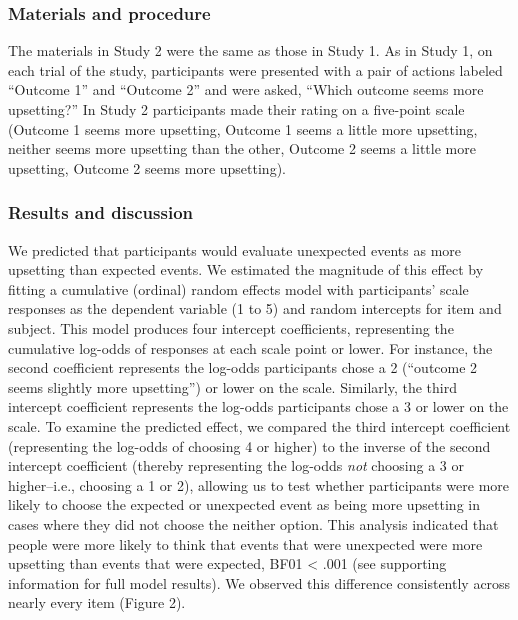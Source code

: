 \documentclass[9pt,twocolumn,twoside,]{pnas-new}
\begin{document}
{\subsubsection*{Materials and procedure}\label{s2-materials-procedure}

The materials in Study 2 were the same as those in Study 1. As in Study
1, on each trial of the study, participants were presented with a pair
of actions labeled ``Outcome 1'' and ``Outcome 2'' and were asked,
``Which outcome seems more upsetting?'' In Study 2 participants made
their rating on a five-point scale (Outcome 1 seems more upsetting,
Outcome 1 seems a little more upsetting, neither seems more upsetting
than the other, Outcome 2 seems a little more upsetting, Outcome 2 seems
more upsetting).

\subsubsection*{Results and discussion}\label{s2-results}

We predicted that participants would evaluate unexpected events as more
upsetting than expected events. We estimated the magnitude of this
effect by fitting a cumulative (ordinal) random effects model with
participants' scale responses as the dependent variable (1 to 5) and
random intercepts for item and subject. This model produces four
intercept coefficients, representing the cumulative log-odds of
responses at each scale point or lower. For instance, the second
coefficient represents the log-odds participants chose a 2 (``outcome 2
seems slightly more upsetting'') or lower on the scale. Similarly, the
third intercept coefficient represents the log-odds participants chose a
3 or lower on the scale. To examine the predicted effect, we compared
the third intercept coefficient (representing the log-odds of choosing 4
or higher) to the inverse of the second intercept coefficient (thereby
representing the log-odds \emph{not} choosing a 3 or higher--i.e.,
choosing a 1 or 2), allowing us to test whether participants were more
likely to choose the expected or unexpected event as being more
upsetting in cases where they did not choose the neither option. This
analysis indicated that people were more likely to think that events
that were unexpected were more upsetting than events that were expected,
BF01 \textless{} .001 (see supporting information for full model
results). We observed this difference consistently across nearly every
item (Figure 2).

}
\end{document}
